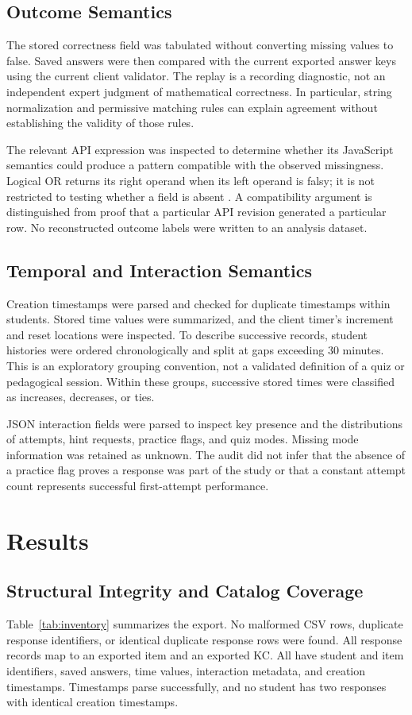 \documentclass[conference]{IEEEtran}
\begin{document}
\subsection{Outcome Semantics}
The stored correctness field was tabulated without converting missing values to false. Saved answers were then compared with the current exported answer keys using the current client validator. The replay is a recording diagnostic, not an independent expert judgment of mathematical correctness. In particular, string normalization and permissive matching rules can explain agreement without establishing the validity of those rules.

The relevant API expression was inspected to determine whether its JavaScript semantics could produce a pattern compatible with the observed missingness. Logical OR returns its right operand when its left operand is falsy; it is not restricted to testing whether a field is absent \cite{mdnOR}. A compatibility argument is distinguished from proof that a particular API revision generated a particular row. No reconstructed outcome labels were written to an analysis dataset.

\subsection{Temporal and Interaction Semantics}
Creation timestamps were parsed and checked for duplicate timestamps within students. Stored time values were summarized, and the client timer's increment and reset locations were inspected. To describe successive records, student histories were ordered chronologically and split at gaps exceeding 30 minutes. This is an exploratory grouping convention, not a validated definition of a quiz or pedagogical session. Within these groups, successive stored times were classified as increases, decreases, or ties.

JSON interaction fields were parsed to inspect key presence and the distributions of attempts, hint requests, practice flags, and quiz modes. Missing mode information was retained as unknown. The audit did not infer that the absence of a practice flag proves a response was part of the study or that a constant attempt count represents successful first-attempt performance.

\section{Results}
\subsection{Structural Integrity and Catalog Coverage}
Table~\ref{tab:inventory} summarizes the export. No malformed CSV rows, duplicate response identifiers, or identical duplicate response rows were found. All \ResponseCount{} response records map to an exported item and an exported KC. All have student and item identifiers, saved answers, time values, interaction metadata, and creation timestamps. Timestamps parse successfully, and no student has two responses with identical creation timestamps.
\end{document}
